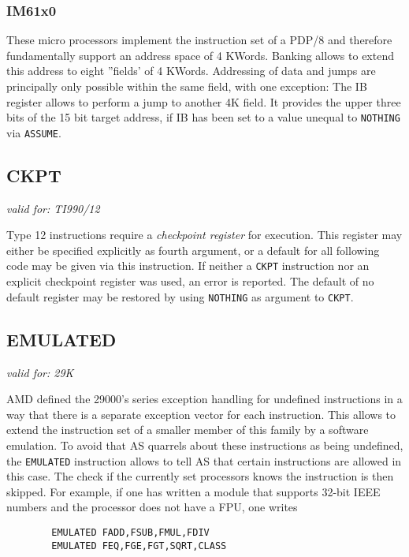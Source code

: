 \documentclass[12pt,twoside]{report}
\makeatletter
\newcommand{\tty}[1]{{\tt #1}}
\newcommand{\ttindex}[1]{\index{#1@{\tt #1}}}
\makeatother
\begin{document}

\subsubsection{IM61x0}

These micro processors implement the instruction set of a PDP/8 and therefore
fundamentally support an address space of 4 KWords. Banking allows to extend this
address to eight ''fields' of 4 KWords. Addressing of data and jumps are principally
only possible within the same field, with one exception: The IB register allows
to perform a jump to another 4K field.  It provides the upper three bits of the
15 bit target address, if IB has been set to a value unequal to \tty{NOTHING} via
\tty{ASSUME}.


\subsection{CKPT}
\ttindex{CKPT}

{\em valid for: TI990/12}

Type 12 instructions require a {\em checkpoint register} for execution.  This
register may either be specified explicitly as fourth argument, or a default for
all following code may be given via this instruction.  If neither a \tty{CKPT}
instruction nor an explicit checkpoint register was used, an error
is reported.  The default of no default register may be restored by using
{\tt NOTHING} as argument to \tty{CKPT}.


\subsection{EMULATED}

{\em valid for: 29K}

AMD defined the 29000's series exception handling for undefined
instructions in a way that there is a separate exception vector for
each instruction.  This allows to extend the instruction set of a
smaller member of this family by a software emulation.  To avoid that
AS quarrels about these instructions as being undefined, the
\tty{EMULATED} instruction allows to tell AS that certain instructions are
allowed in this case.  The check if the currently set processors knows the
instruction is then skipped.  For example, if one has written a module
that supports 32-bit IEEE numbers and the processor does not have a FPU,
one writes
\begin{verbatim}
        EMULATED FADD,FSUB,FMUL,FDIV
        EMULATED FEQ,FGE,FGT,SQRT,CLASS
\end{verbatim}
\end{document}
